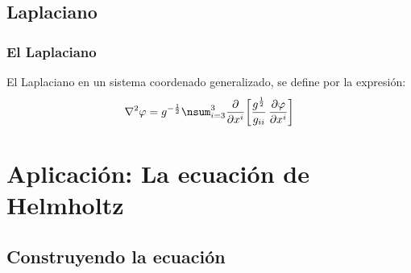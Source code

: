 \documentclass[12pt]{beamer}
\begin{document}
\subsection{Laplaciano}

\begin{frame}
\frametitle{El Laplaciano}
El Laplaciano en un sistema coordenado generalizado, se define por la expresión:
\pause
\begin{align*}
\laplacian{\varphi} = g^{-\frac{1}{2}} \nsum_{i=3}^{3} \pdv{x^{i}} \bigg[ \dfrac{g^{\frac{1}{2}}}{g_{ii}} \, \pdv{\varphi}{x^{i}}\bigg]
\end{align*}
\end{frame}

\section{Aplicación: La ecuación de Helmholtz}
\subsection{Construyendo la ecuación}
\end{document}
